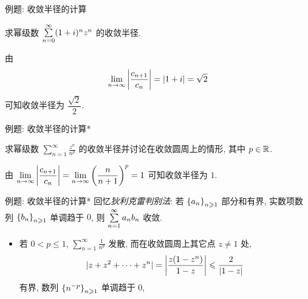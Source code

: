\begin{frame}{例题: 收敛半径的计算}
\onslide<+->
\begin{example}
求幂级数 $\sum\limits_{n=0}^\infty(1+i)^nz^n$ 的收敛半径.
\end{example}
\onslide<+->
\begin{solution}
由 
\[\lim_{n\to\infty}\left|\frac{c_{n+1}}{c_n}\right|=|1+i|=\sqrt2\] 可知收敛半径为 $\dfrac{\sqrt2}2$.
\end{solution}
\end{frame}


\begin{frame}{例题: 收敛半径的计算*}
\onslide<+->
\begin{example}
求幂级数 $\displaystyle\sum_{n=1}^\infty\frac{z^n}{n^p}$ 的收敛半径并讨论在收敛圆周上的情形, 其中 $p\in{\mathbb{R}}$.
\end{example}
\onslide<+->
\begin{solution}
由 $\displaystyle\lim_{n\to\infty}\left|\frac{c_{n+1}}{c_n}\right|=\lim_{n\to\infty}\left(\frac n{n+1}\right)^p=1$ 可知收敛半径为 $1$.
\end{solution}
\end{frame}


\begin{frame}{例题: 收敛半径的计算*}
\onslide<+->
回忆\emph{狄利克雷判别法}: 若 ${\left\{a_n\right\}}_{n\geqslant 1}$ 部分和有界, 实数项数列 ${\left\{b_n\right\}}_{n\geqslant 1}$ 单调趋于 $0$, 则 $\sum\limits_{n=1}^\infty a_nb_n$ 收敛.

\onslide<+->
\begin{solutionc}
\begin{itemize}
\item 若 $0<p\le1$, $\displaystyle\sum_{n=1}^\infty\frac1{n^p}$ 发散, 
\onslide<+->
而在收敛圆周上其它点 $z\neq1$ 处,
\[|z+z^2+\cdots+z^n|=\left|\frac{z(1-z^n)}{1-z}\right|
\leqslant\frac{2}{|1-z|}\]
有界, 数列 ${\left\{n^{-p}\right\}}_{n\geqslant 1}$ 单调趋于 $0$,
\end{itemize}
\end{solutionc}
\end{frame}


